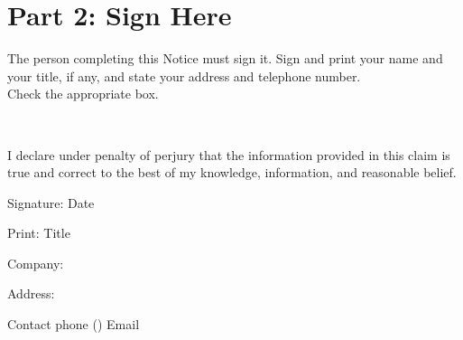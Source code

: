 \documentclass[11pt]{article}
\begin{document}
\section*{Part 2: Sign Here}

\noindent The person completing this Notice must sign it. Sign and print your name and your title, if any, and state your address and telephone number. \\
Check the appropriate box.

\noindent {} \\

\noindent I declare under penalty of perjury that the information provided in this claim is true and correct to the best of my knowledge, information, and reasonable belief.

\vspace{2em} %

\noindent Signature: \hrulefill Date \hrulefill

\vspace{2em} %

\noindent Print: \hrulefill Title \hrulefill

\vspace{2em} %

\noindent Company: \hrulefill

\vspace{2em} %

\noindent Address: \hrulefill

\vspace{2em} %

\noindent Contact phone (\hrulefill) \hrulefill Email \hrulefill
\end{document}
